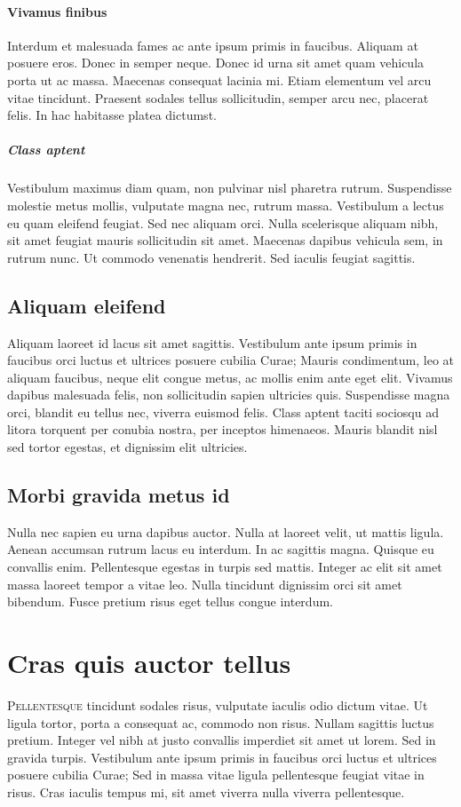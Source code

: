\documentclass[11pt, a4paper]{memoir}
\begin{document}
\paragraph{Vivamus finibus}
Interdum et malesuada fames ac ante ipsum primis in faucibus. Aliquam at posuere eros. Donec in semper neque. Donec id urna sit amet quam vehicula porta ut ac massa. Maecenas consequat lacinia mi. Etiam elementum vel arcu vitae tincidunt. Praesent sodales tellus sollicitudin, semper arcu nec, placerat felis. In hac habitasse platea dictumst.

\subparagraph{Class aptent}
Vestibulum maximus diam quam, non pulvinar nisl pharetra rutrum. Suspendisse molestie metus mollis, vulputate magna nec, rutrum massa. Vestibulum a lectus eu quam eleifend feugiat. Sed nec aliquam orci. Nulla scelerisque aliquam nibh, sit amet feugiat mauris sollicitudin sit amet. Maecenas dapibus vehicula sem, in rutrum nunc. Ut commodo venenatis hendrerit. Sed iaculis feugiat sagittis.

\subsection{Aliquam eleifend}
Aliquam laoreet id lacus sit amet sagittis. Vestibulum ante ipsum primis in faucibus orci luctus et ultrices posuere cubilia Curae; Mauris condimentum, leo at aliquam faucibus, neque elit congue metus, ac mollis enim ante eget elit. Vivamus dapibus malesuada felis, non sollicitudin sapien ultricies quis. Suspendisse magna orci, blandit eu tellus nec, viverra euismod felis. Class aptent taciti sociosqu ad litora torquent per conubia nostra, per inceptos himenaeos. Mauris blandit nisl sed tortor egestas, et dignissim elit ultricies.

\subsection{Morbi gravida metus id}
Nulla nec sapien eu urna dapibus auctor. Nulla at laoreet velit, ut mattis ligula. Aenean accumsan rutrum lacus eu interdum. In ac sagittis magna. Quisque eu convallis enim. Pellentesque egestas in turpis sed mattis. Integer ac elit sit amet massa laoreet tempor a vitae leo. Nulla tincidunt dignissim orci sit amet bibendum. Fusce pretium risus eget tellus congue interdum.

\section{Cras quis auctor tellus}
\lettrine{P}{ellentesque} tincidunt sodales risus, vulputate iaculis odio dictum vitae. Ut ligula tortor, porta a consequat ac, commodo non risus. Nullam sagittis luctus pretium. Integer vel nibh at justo convallis imperdiet sit amet ut lorem. Sed in gravida turpis. Vestibulum ante ipsum primis in faucibus orci luctus et ultrices posuere cubilia Curae; Sed in massa vitae ligula pellentesque feugiat vitae in risus. Cras iaculis tempus mi, sit amet viverra nulla viverra pellentesque.
\end{document}
